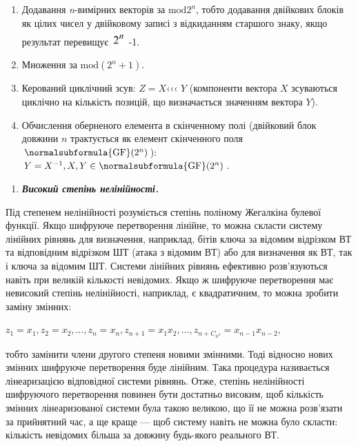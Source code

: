 \liststyleWWviiiNumxxxii
\setcounter{saveenum}{\value{enumi}}
\begin{enumerate}
\setcounter{enumi}{\value{saveenum}}
\item Додавання \textit{n}{}-вимірних векторів за  $\text{mod}2^n$, тобто
додавання двійкових блоків як цілих чисел у двійковому записі з відкиданням
старшого знаку, якщо результат перевищує 
\includegraphics[width=0.2083in,height=0.2362in]{crypt-img/crypt-img294.png}
{}-1. 
\item Множення за  $\text{mod}(2^n+1)$.
\item Керований циклічний зсув: \textbf{ } $Z=X$‹‹‹ $Y$ (компоненти вектора 
$X$ зсуваються циклічно на кількість позицій, що визначається значенням
вектора $Y$).
\item Обчислення оберненого  елемента  в скінченному полі (двійковий блок
довжини  $n$ трактується як елемент скінченного поля 
$\normalsubformula{\text{GF}}(2^n)$):   ${Y=X^{-1},X,Y\in
\normalsubformula{\text{GF}}(2^{n})}$.
\end{enumerate}

\bigskip

\liststyleWWviiiNumxxxv
\begin{enumerate}
\item {\bfseries\itshape
Високий степінь нелінійності.}
\end{enumerate}
Під степенем нелінійності розуміється степінь поліному Жегалкіна булевої
функції. Якщо шифруюче перетворення лінійне, то можна скласти систему лінійних
рівнянь для визначення, наприклад, бітів ключа за відомим відрізком ВТ та
відповідним відрізком ШТ (атака з відомим ВТ) або для визначення як ВТ, так і
ключа за відомим ШТ. Системи лінійних рівнянь ефективно розв’язуються навіть
при великій кількості невідомих. Якщо ж шифруюче перетворення має невисокий
степінь нелінійності, наприклад, є квадратичним, то можна зробити заміну
змінних:

{\centering

$z_{1}=x_{1},z_{2}=x_{2},\dots,z_{n}=x_{n},z_{n+1}=x_{1}x_{2},\dots,z_{n+C_{{n}^2}}=x_{n-1}{x_{n-2}}$,
\par}

тобто замінити члени другого степеня новими змінними. Тоді відносно нових
змінних шифруюче перетворення буде лінійним.  Така процедура називається
лінеаризацією відповідної системи рівнянь. Отже, степінь нелінійності
шифруючого перетворення повинен бути достатньо високим, щоб кількість змінних
лінеаризованої системи була такою\textbf{ }великою, що її не можна розв’язати
за прийнятний час, а ще краще ---\textbf{ }щоб систему\textbf{ }навіть не можна
було скласти: кількість невідомих більша за довжину будь-якого реального ВТ.

